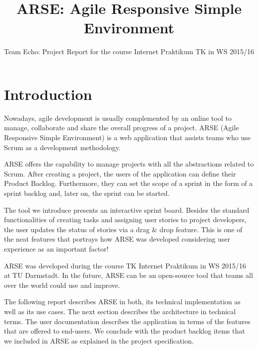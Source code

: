 \documentclass[
	accentcolor=tud1a %
]{tudreport}
\begin{document}
\title{ARSE: Agile Responsive Simple Environment}
\subtitle{Team Echo: Project Report for the course Internet Praktikum TK in WS 2015/16}

\maketitle

\tableofcontents

\chapter{Introduction}
\label{ch:introduction}

Nowadays, agile development is usually complemented by an online tool to manage, collaborate and share the overall progress of a project. ARSE (Agile Responsive Simple Environment) is a web application that assists teams who use Scrum as a development methodology. 

ARSE offers the capability to manage projects with all the abstractions related to Scrum. After creating a project, the users of the application can define their Product Backlog. Furthermore, they can set the scope of a sprint in the form of a sprint backlog and, later on, the sprint can be started. 

The tool we introduce presents an interactive sprint board. Besides the standard functionalities of creating tasks and assigning user stories to project developers, the user updates the status of stories via a drag \& drop feature. This is one of the neat features that portrays how ARSE was developed considering user experience as an important factor!

ARSE was developed during the course TK Internet Praktikum in WS 2015/16 at TU Darmstadt. In the future, ARSE can be an open-source tool that teams all over the world could use and improve. 

The following report describes ARSE in both, its technical implementation as well as its use cases. The next section describes the architecture in technical terms. The user documentation describes the application in terms of the features that are offered to end-users. We conclude with the product backlog items that we included in ARSE as explained in the project specification. 
\end{document}

